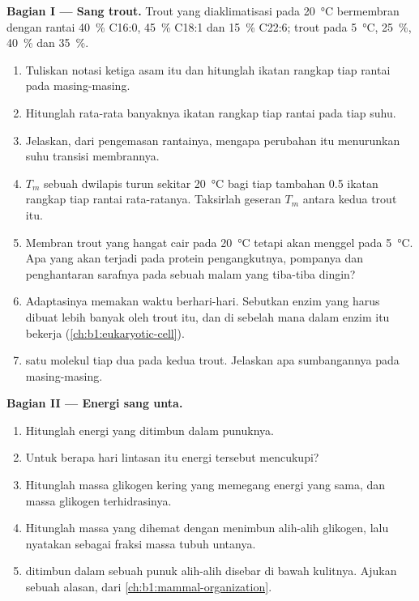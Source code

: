 \begin{problem}
\medskip
\noindent\textbf{Bagian I --- Sang trout.}
Trout yang diaklimatisasi pada \qty{20}{\celsius} bermembran dengan
rantai \qty{40}{\%} C16:0, \qty{45}{\%} C18:1 dan \qty{15}{\%} C22:6;
trout pada \qty{5}{\celsius}, \qty{25}{\%}, \qty{40}{\%} dan \qty{35}{\%}.
\begin{enumerate}
  \item Tuliskan notasi ketiga asam itu dan hitunglah ikatan rangkap
        tiap rantai pada masing-masing.
  \item Hitunglah rata-rata banyaknya ikatan rangkap tiap rantai pada
        tiap suhu.
  \item Jelaskan, dari pengemasan rantainya, mengapa perubahan itu
        menurunkan suhu transisi membrannya.
  \item $T_m$ sebuah dwilapis turun sekitar \qty{20}{\celsius} bagi
        tiap tambahan \qty{0.5}{} ikatan rangkap tiap rantai
        rata-ratanya. Taksirlah geseran $T_m$ antara kedua trout itu.
  \item Membran trout yang hangat cair pada \qty{20}{\celsius} tetapi
        akan menggel pada \qty{5}{\celsius}. Apa yang akan terjadi pada
        protein pengangkutnya, pompanya dan penghantaran sarafnya pada
        sebuah malam yang tiba-tiba dingin?
  \item Adaptasinya memakan waktu berhari-hari. Sebutkan enzim yang
        harus dibuat lebih banyak oleh trout itu, dan di sebelah mana
        dalam  enzim itu bekerja (\cref{ch:b1:eukaryotic-cell}).
  \item {} satu molekul tiap dua  pada kedua
        trout. Jelaskan apa sumbangannya pada masing-masing.
\end{enumerate}

\medskip
\noindent\textbf{Bagian II --- Energi sang unta.}
\begin{enumerate}[resume]
  \item Hitunglah energi yang ditimbun dalam punuknya.
  \item Untuk berapa hari lintasan itu energi tersebut mencukupi?
  \item Hitunglah massa glikogen kering yang memegang energi yang sama,
        dan massa glikogen terhidrasinya.
  \item Hitunglah massa yang dihemat dengan menimbun  alih-alih
        glikogen, lalu nyatakan sebagai fraksi massa tubuh untanya.
  \item {} ditimbun dalam sebuah punuk alih-alih disebar di bawah
        kulitnya. Ajukan sebuah alasan, dari 
        \cref{ch:b1:mammal-organization}.
\end{enumerate}


\end{problem}
